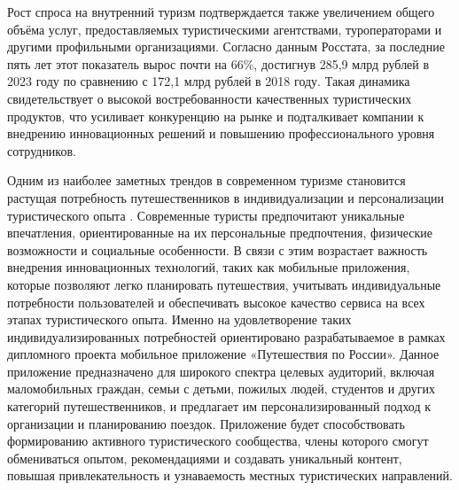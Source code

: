 Рост спроса на внутренний туризм подтверждается также увеличением общего объёма услуг, предоставляемых туристическими агентствами, туроператорами и другими профильными организациями. Согласно данным Росстата, за последние пять лет этот показатель вырос почти на 66\%, достигнув 285,9 млрд рублей в 2023 году по сравнению с 172,1 млрд рублей в 2018 году. Такая динамика свидетельствует о высокой востребованности качественных туристических продуктов, что усиливает конкуренцию на рынке и подталкивает компании к внедрению инновационных решений и повышению профессионального уровня сотрудников.

Одним из наиболее заметных трендов в современном туризме становится растущая потребность путешественников в индивидуализации и персонализации туристического опыта \cite{12}. Современные туристы предпочитают уникальные впечатления, ориентированные на их персональные предпочтения, физические возможности и социальные особенности. В связи с этим возрастает важность внедрения инновационных технологий, таких как мобильные приложения, которые позволяют легко планировать путешествия, учитывать индивидуальные потребности пользователей и обеспечивать высокое качество сервиса на всех этапах туристического опыта.
Именно на удовлетворение таких индивидуализированных потребностей ориентировано разрабатываемое в рамках дипломного проекта мобильное приложение «Путешествия по России». Данное приложение предназначено для широкого спектра целевых аудиторий, включая маломобильных граждан, семьи с детьми, пожилых людей, студентов и других категорий путешественников, и предлагает им персонализированный подход к организации и планированию поездок. Приложение будет способствовать формированию активного туристического сообщества, члены которого смогут обмениваться опытом, рекомендациями и создавать уникальный контент, повышая привлекательность и узнаваемость местных туристических направлений.

